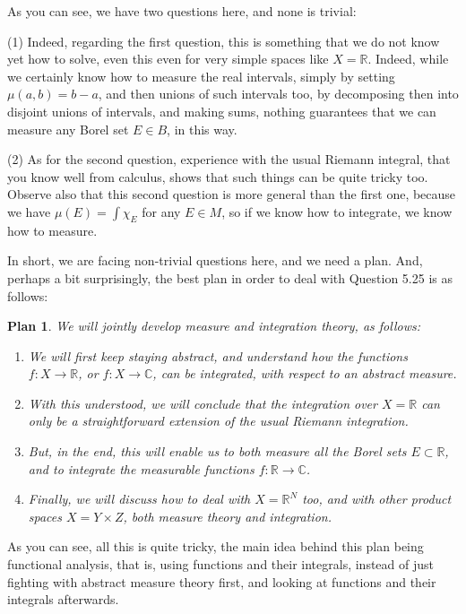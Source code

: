 \documentclass[12pt]{amsbook}
\newtheorem{plan}[theorem]{Plan}
\begin{document}
As you can see, we have two questions here, and none is trivial:

\bigskip

(1) Indeed, regarding the first question, this is something that we do not know yet how to solve, even this even for very simple spaces like $X=\mathbb R$. Indeed, while we certainly know how to measure the real intervals, simply by setting $\mu(a,b)=b-a$, and then unions of such intervals too, by decomposing then into disjoint unions of intervals, and making sums, nothing guarantees that we can measure any Borel set $E\in B$, in this way. 

\bigskip

(2) As for the second question, experience with the usual Riemann integral, that you know well from calculus, shows that such things can be quite tricky too. Observe also that this second question is more general than the first one, because we have $\mu(E)=\int\chi_E$ for any $E\in M$, so if we know how to integrate, we know how to measure. 

\bigskip

In short, we are facing non-trivial questions here, and we need a plan. And, perhaps a bit surprisingly, the best plan in order to deal with Question 5.25 is as follows:

\begin{plan}
We will jointly develop measure and integration theory, as follows:
\begin{enumerate}
\item We will first keep staying abstract, and understand how the functions $f:X\to\mathbb R$, or $f:X\to\mathbb C$, can be integrated, with respect to an abstract measure.

\item With this understood, we will conclude that the integration over $X=\mathbb R$ can only be a straightforward extension of the usual Riemann integration.

\item But, in the end, this will enable us to both measure all the Borel sets $E\subset\mathbb R$, and to integrate the measurable functions $f:\mathbb R\to\mathbb C$.

\item Finally, we will discuss how to deal with $X=\mathbb R^N$ too, and with other product spaces $X=Y\times Z$, both measure theory and integration.
\end{enumerate}
\end{plan}

As you can see, all this is quite tricky, the main idea behind this plan being functional analysis, that is, using functions and their integrals, instead of just fighting with abstract measure theory first, and looking at functions and their integrals afterwards.
\end{document}
